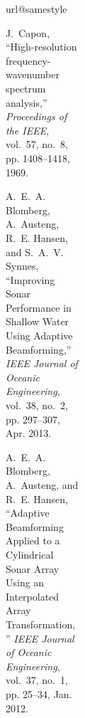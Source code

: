 \begin{figure}[tbp]
\begin{figure}[tbp]
\begin{figure*}[t]
\begin{figure*}[tbp]
\begin{figure*}[tb]
\ifCLASSOPTIONcaptionsoff
  \newpage
\fi

\ifPhdDoc
\let\thesection\oldthesection
\let\thesubsection\oldthesubsection
{}
   \printbibliography[title=References,heading=subbibliography]
%    
\else
{}
   \ifBuildBibliography
      
      

   \else

      \begin{thebibliography}{10}
      \providecommand{\url}[1]{#1}
      \csname url@samestyle\endcsname
      \providecommand{\newblock}{\relax}
      \providecommand{\bibinfo}[2]{#2}
      \providecommand{\BIBentrySTDinterwordspacing}{\spaceskip=0pt\relax}
      \providecommand{\BIBentryALTinterwordstretchfactor}{4}
      \providecommand{\BIBentryALTinterwordspacing}{\spaceskip=\fontdimen2\font plus
      \BIBentryALTinterwordstretchfactor\fontdimen3\font minus
      \fontdimen4\font\relax}
      \providecommand{\BIBforeignlanguage}[2]{{%
      \expandafter\ifx\csname l@#1\endcsname\relax
      \typeout{** WARNING: IEEEtran.bst: No hyphenation pattern has been}%
      \typeout{** loaded for the language `#1'. Using the pattern for}%
      \typeout{** the default language instead.}%
      \else
      \language=\csname l@#1\endcsname
      \fi
      #2}}
      \providecommand{\BIBdecl}{\relax}
      \BIBdecl

      J.~Capon, ``{High-resolution frequency-wavenumber spectrum analysis},''
      \emph{Proceedings of the IEEE}, vol.~57, no.~8, pp. 1408--1418, 1969.

      A.~E.~A. Blomberg, A.~Austeng, R.~E. Hansen, and S.~A.~V. Synnes, ``{Improving
      Sonar Performance in Shallow Water Using Adaptive Beamforming},'' \emph{IEEE
      Journal of Oceanic Engineering}, vol.~38, no.~2, pp. 297--307, Apr. 2013.

      A.~E.~A. Blomberg, A.~Austeng, and R.~E. Hansen, ``{Adaptive Beamforming
      Applied to a Cylindrical Sonar Array Using an Interpolated Array
      Transformation},'' \emph{IEEE Journal of Oceanic Engineering}, vol.~37,
      no.~1, pp. 25--34, Jan. 2012.


\end{thebibliography}
\end{figure*}
\end{figure*}
\end{figure*}
\end{figure}
\end{figure}
